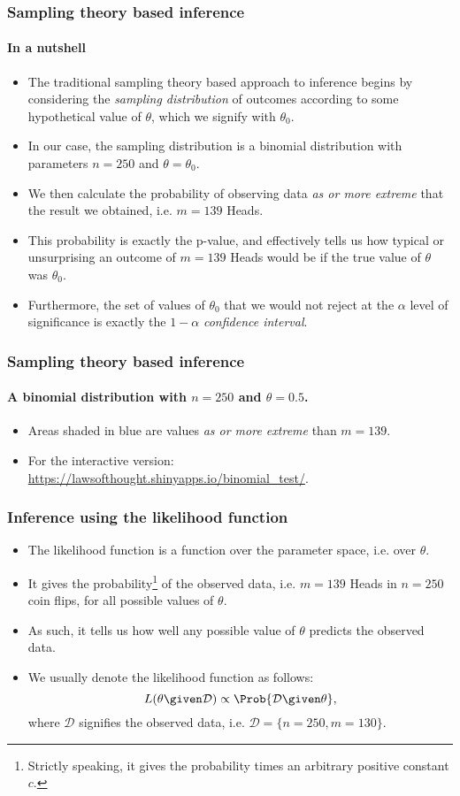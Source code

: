 \documentclass{slides}
\begin{document}
\begin{frame}
	\frametitle{Sampling theory based inference}
	\framesubtitle{In a nutshell}
	\begin{itemize}
		\item The traditional sampling theory based approach to inference begins by considering the \emph{sampling distribution} 
			of outcomes according to some hypothetical value of $\theta$, which we signify with $\theta_0$.
		\item In our case, the sampling distribution is a binomial distribution with parameters $n=250$ and $\theta=\theta_0$.
		\item We then calculate the probability of observing data \emph{as or more extreme} that the result we obtained, i.e. $m=139$ Heads.
		\item This probability is exactly the p-value, and effectively tells us how typical or unsurprising an outcome of $m=139$ Heads would be if the true value of $\theta$ was $\theta_0$.
		\item Furthermore, the set of values of $\theta_0$ that we would not reject at the $\alpha$ level of significance is exactly the $1-\alpha$ \emph{confidence interval}.
	\end{itemize}
\end{frame}

\begin{frame}
	\frametitle{Sampling theory based inference}
	\framesubtitle{A binomial distribution with $n=250$ and $\theta=0.5$.}
	
	{\small
	\begin{itemize}
	\item Areas shaded in blue are values \emph{as or more extreme} than $m=139$.
	\item For the interactive version: \url{https://lawsofthought.shinyapps.io/binomial_test/}.
	\end{itemize}
	}
\end{frame}

\begin{frame}
	\frametitle{Inference using the likelihood function}
		\begin{itemize}
			\item The likelihood function is a function over the parameter space, i.e. over $\theta$.
			\item It gives the probability\footnote{Strictly speaking, it gives the probability times an arbitrary positive constant $c$.}
				of the observed data, i.e. $m=139$ Heads in $n=250$ coin flips, for all possible values of $\theta$.
			\item As such, it tells us how well any possible value of $\theta$ predicts the observed data.
			\item We usually denote the likelihood function as follows:
				\[L(\theta\given\mathcal{D}) \propto \Prob{\mathcal{D}\given\theta},\]
				where $\mathcal{D}$ signifies the observed data, i.e. $\mathcal{D} = \{n=250, m=130\}$.
		\end{itemize}
\end{frame}
\end{document}
